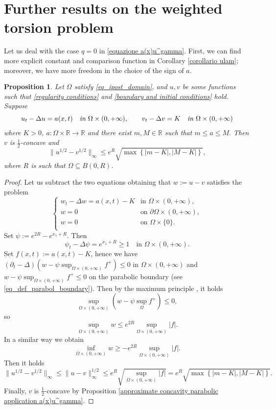 \documentclass[11pt, reqno]{amsart}
\newtheorem{proposition}[lemma]{Proposition}
\theoremstyle{definition}
\numberwithin{equation}{section}
\newcommand{\R}{\mathbb{R}}
\def\norm#1{\|#1\|}
\begin{document}
\section{Further results on the weighted torsion problem}
\label{sec_torsion}

Let us deal with the case $q=0$ in \eqref{equazione a(x)u^gamma}.
First, we can find more explicit constant and comparison function in Corollary \ref{corollario ulam}; moreover, we have more freedom in the choice of the sign of $a$.

\begin{proposition}
	Let $\Omega$ satisfy \eqref{eq_ipost_domain}, and $u,v$ be some functions such that \eqref{regularity conditions} and \eqref{boundary and initial conditions} hold. Suppose
	\begin{equation*}
		u_t-\Delta u=a(x, t) \quad \emph{in }\Omega\times (0,+\infty), \qquad 		v_t-\Delta v=K\quad\emph{in }\Omega\times (0,+\infty)
	\end{equation*}
	where $K>0$, $a\colon\Omega \times \R \to \R$ and there exist $m,M\in\R$ such that $m\leq a\leq M.$ 
	Then $v$ is $\frac{1}{2}$-concave and
	\[ \norm{u^{1/2}-v^{1/2}}_\infty\leq e^{R}\sqrt{\max\left\{|m-K|,|M-K|\right\}}, \]
	where $R$ is such that $\Omega\subseteq B(0,R)$.
\end{proposition}
\begin{proof}
	Let us subtract the two equations obtaining that $w:=u-v$ satisfies the problem 
	\begin{equation*}
		\begin{cases}
			w_t-\Delta w=a(x, t)-K &\text{in }\Omega\times (0,+\infty),\\
			w=0 & \text{on }\partial \Omega\times (0,+\infty),\\ 
			w=0& \text{on } \Omega \times \{0\}. \\
		\end{cases}
	\end{equation*}
	Set $\psi:= e^{2R}-e^{x_1+R}$. 
	Then
	\[ \psi_t - \Delta \psi =e^{x_1+R}\geq 1 \quad \text{in }\Omega \times (0,+\infty).\]
	Set $f(x,t):= a(x, t)-K$, hence we have $(\partial_t-\Delta)(w-\psi\sup_{\Omega\times(0,+\infty)} f^+)\leq0$ in $\Omega\times (0,+\infty)$ and $w-\psi \sup_{\Omega\times(0,+\infty)} f^+\leq 0$ on the parabolic boundary (see \eqref{eq_def_parabol_boundary}).
	Then by the maximum principle \cite[Corollary 2.5]{lieberman1996}, it holds $$\sup\limits_{\Omega\times (0,+\infty)}(w-\psi\sup_\Omega f^+)\leq 0,$$ 
	so
	$$\sup_{\Omega\times (0,+\infty)}w\leq e^{2R}\sup_{\Omega\times(0,+\infty)} |f|.$$
	In a similar way we obtain
	$$\inf_{\Omega\times (0,+\infty)}w\geq -e^{2R}\sup_{\Omega\times(0,+\infty)} |f|.$$
	Then it holds
	\begin{equation*}
		\norm{u^{1/2}-v^{1/2}}_\infty\leq	\norm{u-v}^{1/2}_\infty \leq e^{R}\sqrt{\sup_{\Omega\times(0,+\infty)} |f|} =e^R\sqrt{\max\left\{|m-K|,|M-K|\right\}}. 
	\end{equation*}
	Finally, $v$ is $\frac{1}{2}$-concave by Proposition \ref{approximate concavity parabolic application a(x)u^gamma}.
\end{proof}
\end{document}
